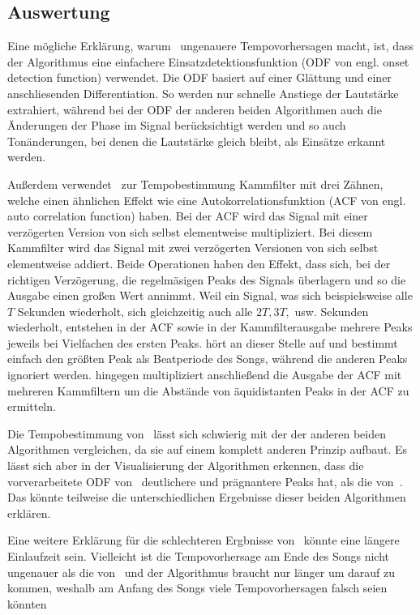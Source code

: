 {	\subsection{Auswertung}
	{

		Eine mögliche Erklärung,
			warum~\cite{2001_BeatThis} ungenauere Tempovorhersagen macht,
			ist,
			dass der Algorithmus eine einfachere Einsatzdetektionsfunktion (ODF von engl. onset detection function) verwendet.
		Die ODF basiert auf einer Glättung und einer anschliesenden Differentiation.
		So werden nur schnelle Anstiege der Lautstärke extrahiert,
			während bei der ODF der anderen beiden Algorithmen auch die Änderungen der Phase im Signal berücksichtigt werden
			und so auch Tonänderungen,
			bei denen die Lautstärke gleich bleibt,
			als Einsätze erkannt werden.

		Au{\ss}erdem verwendet~\cite{2001_BeatThis} zur Tempobestimmung Kammfilter mit drei Zähnen,
			welche einen ähnlichen Effekt wie eine Autokorrelationsfunktion (ACF von engl. auto correlation function) haben.
		Bei der ACF wird das Signal mit einer verzögerten Version von sich selbst elementweise multipliziert.
		Bei diesem Kammfilter wird das Signal mit zwei verzögerten Versionen von sich selbst elementweise addiert.
		Beide Operationen haben den Effekt,
			dass sich,
			bei der richtigen Verzögerung,
			die regelmäsigen Peaks des Signals überlagern
			und so die Ausgabe einen gro{\ss}en Wert annimmt.
		Weil ein Signal,
			was sich beispielsweise alle $T$ Sekunden wiederholt,
			sich gleichzeitig auch alle $2T, 3T,$ usw. Sekunden wiederholt,
			entstehen in der ACF sowie in der Kammfilterausgabe mehrere Peaks jeweils bei Vielfachen des ersten Peaks.
		\cite{2001_BeatThis} hört an dieser Stelle auf
			und bestimmt einfach den grö{\ss}ten Peak als Beatperiode des Songs,
			während die anderen Peaks ignoriert werden.
		\cite{2009_DaPlSt} hingegen multipliziert anschlie{\ss}end die Ausgabe der ACF mit mehreren Kammfiltern
			um die Abstände von äquidistanten Peaks in der ACF zu ermitteln.

		Die Tempobestimmung von~\cite{2011_PlRoSt} lässt sich schwierig mit der der anderen beiden Algorithmen vergleichen,
			da sie auf einem komplett anderen Prinzip aufbaut.
		Es lässt sich aber in der Visualisierung der Algorithmen erkennen,
			dass die vorverarbeitete ODF von~\cite{2009_DaPlSt} deutlichere und prägnantere Peaks hat,
			als die von~\cite{2011_PlRoSt}.
		Das könnte teilweise die unterschiedlichen Ergebnisse dieser beiden Algorithmen erklären.

		Eine weitere Erklärung für die schlechteren Ergbnisse von~\cite{2011_PlRoSt} könnte eine längere Einlaufzeit sein.
		Vielleicht ist die Tempovorhersage am Ende des Songs nicht ungenauer als die von~\cite{2009_DaPlSt}
			und der Algorithmus braucht nur länger um darauf zu kommen,
			weshalb am Anfang des Songs viele Tempovorhersagen falsch seien könnten
	}
}

